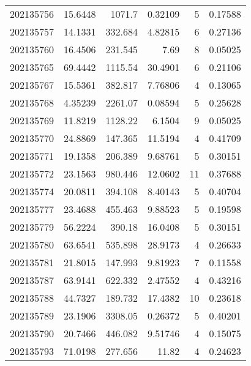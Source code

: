 \begin{tabular}{rrrrrr}
 202135756 &         15.6448  &     1071.7    &            0.32109 &           5 & 0.17588 \\
 202135757 &         14.1331  &      332.684  &            4.82815 &           6 & 0.27136 \\
 202135760 &         16.4506  &      231.545  &            7.69    &           8 & 0.05025 \\
 202135765 &         69.4442  &     1115.54   &           30.4901  &           6 & 0.21106 \\
 202135767 &         15.5361  &      382.817  &            7.76806 &           4 & 0.13065 \\
 202135768 &          4.35239 &     2261.07   &            0.08594 &           5 & 0.25628 \\
 202135769 &         11.8219  &     1128.22   &            6.1504  &           9 & 0.05025 \\
 202135770 &         24.8869  &      147.365  &           11.5194  &           4 & 0.41709 \\
 202135771 &         19.1358  &      206.389  &            9.68761 &           5 & 0.30151 \\
 202135772 &         23.1563  &      980.446  &           12.0602  &          11 & 0.37688 \\
 202135774 &         20.0811  &      394.108  &            8.40143 &           5 & 0.40704 \\
 202135777 &         23.4688  &      455.463  &            9.88523 &           5 & 0.19598 \\
 202135779 &         56.2224  &      390.18   &           16.0408  &           5 & 0.30151 \\
 202135780 &         63.6541  &      535.898  &           28.9173  &           4 & 0.26633 \\
 202135781 &         21.8015  &      147.993  &            9.81923 &           7 & 0.11558 \\
 202135787 &         63.9141  &      622.332  &            2.47552 &           4 & 0.43216 \\
 202135788 &         44.7327  &      189.732  &           17.4382  &          10 & 0.23618 \\
 202135789 &         23.1906  &     3308.05   &            0.26372 &           5 & 0.40201 \\
 202135790 &         20.7466  &      446.082  &            9.51746 &           4 & 0.15075 \\
 202135793 &         71.0198  &      277.656  &           11.82    &           4 & 0.24623 \\

\end{tabular}
